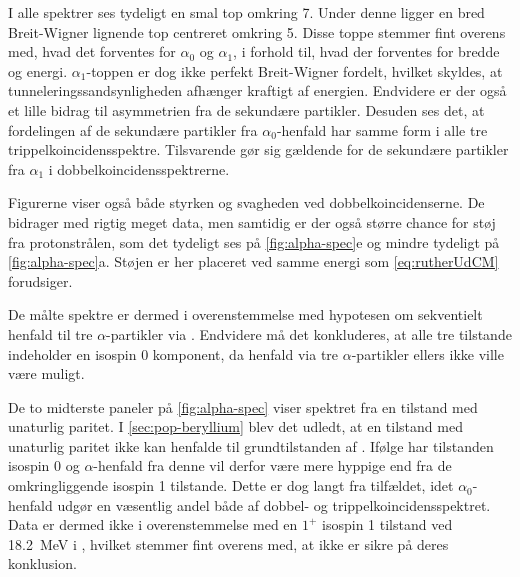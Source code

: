 
I alle spektrer ses tydeligt en smal top omkring 7\MeV. Under denne ligger en bred Breit-Wigner
lignende top centreret omkring 5\MeV. Disse toppe stemmer fint overens med, hvad det forventes for
$\alpha_{0}$ og $\alpha_{1}$, i forhold til, hvad der forventes for bredde og energi.
$\alpha_{1}$-toppen er dog ikke perfekt Breit-Wigner fordelt, hvilket skyldes, at
tunneleringssandsynligheden afhænger kraftigt af energien. Endvidere er der også et lille bidrag til
asymmetrien fra de sekundære partikler. Desuden ses det, at fordelingen af de sekundære partikler
fra $\alpha_{0}$-henfald har samme form i alle tre trippelkoincidensspektre. Tilsvarende gør sig gældende
for de sekundære partikler fra $\alpha_{1}$ i dobbelkoincidensspektrerne.

Figurerne viser også både styrken og svagheden ved dobbelkoincidenserne. De bidrager med rigtig
meget data, men samtidig er der også større chance for støj fra protonstrålen, som det tydeligt ses
på \cref{fig:alpha-spec}e og mindre tydeligt på \cref{fig:alpha-spec}a. Støjen er her placeret ved
samme energi som \cref{eq:rutherUdCM} forudsiger.

De målte spektre er dermed i overenstemmelse med hypotesen om sekventielt henfald til tre
$\alpha$-partikler via \Be. Endvidere må det konkluderes, at alle tre tilstande indeholder en isospin 0
komponent, da henfald via tre $\alpha$-partikler ellers ikke ville være muligt. 

De to midterste paneler på \cref{fig:alpha-spec} viser spektret fra en tilstand med unaturlig paritet. I
\cref{sec:pop-beryllium} blev det udledt, at en tilstand med unaturlig paritet ikke kan henfalde til
grundtilstanden af \Be. Ifølge \cite{States} har tilstanden isospin 0 og $\alpha$-henfald fra denne vil
derfor være mere hyppige end fra de omkringliggende isospin 1 tilstande. Dette er dog langt fra
tilfældet, idet $\alpha_{0}$-henfald udgør en væsentlig andel både af dobbel- og
trippelkoincidensspektret. Data er dermed ikke i overenstemmelse med en $1^{+}$ isospin 1 tilstand
ved \SI{18.2}{\MeV} i \Carb, hvilket stemmer fint overens med, at \cite{States} ikke er sikre på
deres konklusion.


